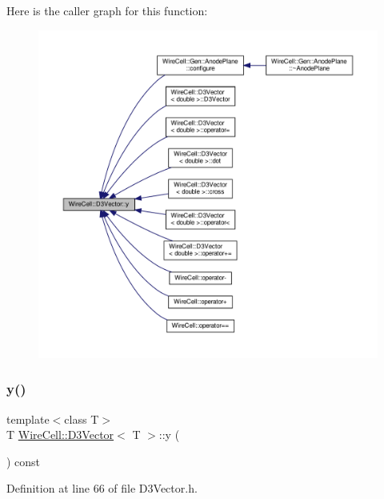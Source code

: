 Here is the caller graph for this function\+:
\nopagebreak
\begin{figure}[H]
\begin{center}
\leavevmode
\includegraphics[width=350pt]{class_wire_cell_1_1_d3_vector_aa163ee62b7a8643fa374b2c4d3e3b386_icgraph}
\end{center}
\end{figure}
\mbox{\label{class_wire_cell_1_1_d3_vector_ad570e3dbb22e60a480ced87c278f4466}} 
\subsubsection{\texorpdfstring{y()}{y()}\hspace{0.1cm}{\footnotesize\ttfamily [2/2]}}
{\footnotesize\ttfamily template$<$class T$>$ \\
T \hyperlink{class_wire_cell_1_1_d3_vector}{Wire\+Cell\+::\+D3\+Vector}$<$ T $>$\+::y (\begin{DoxyParamCaption}{ }\end{DoxyParamCaption}) const\hspace{0.3cm}{\ttfamily [inline]}}



Definition at line 66 of file D3\+Vector.\+h.

